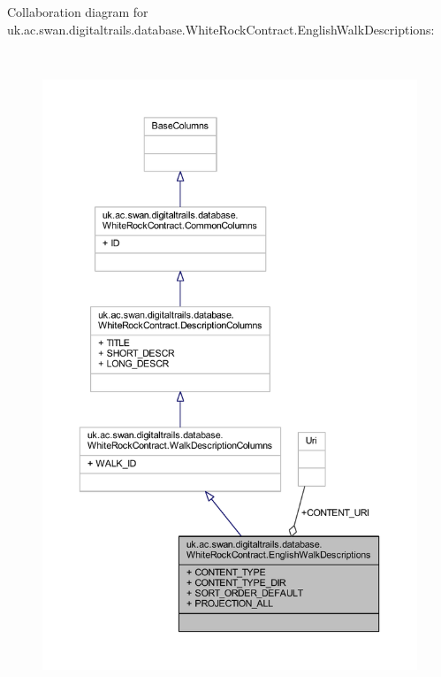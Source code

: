 Collaboration diagram for uk.\+ac.\+swan.\+digitaltrails.\+database.\+White\+Rock\+Contract.\+English\+Walk\+Descriptions\+:
\nopagebreak
\begin{figure}[H]
\begin{center}
\leavevmode
\includegraphics[height=550pt]{classuk_1_1ac_1_1swan_1_1digitaltrails_1_1database_1_1_white_rock_contract_1_1_english_walk_descriptions__coll__graph}
\end{center}
\end{figure}
